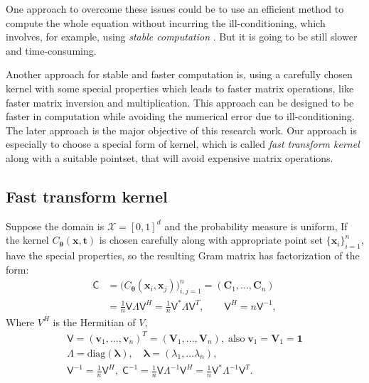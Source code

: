 \documentclass[smallextended]{svjour3}       %
\newcommand{\bm}[1]{\boldsymbol{#1}}
\newcommand{\vlambda}{{\bm{\lambda}}}
\newcommand{\vtheta}{{\bm{\theta}}}
\newcommand{\vC}{\bm{C}}
\newcommand{\vt}{\bm{t}}
\newcommand{\vv}{\bm{v}}
\newcommand{\vV}{\bm{V}}
\newcommand{\vx}{\bm{x}}
\newcommand{\vone}{\bm{1}}
\newcommand{\mC}{\mathsf{C}}
\newcommand{\mCInv}{{\mathsf{C}^{-1}}}
\newcommand{\mLambda}{\mathsf{\Lambda}}
\newcommand{\mV}{\mathsf{V}}
\newcommand{\diag}{\text{diag}}
\begin{document}
One approach to overcome these issues could be to use an efficient method to compute the whole equation without incurring the ill-conditioning, which involves, for example, using \textit{stable computation} \cite{FassBook2007}. But it is going to be still slower and time-consuming. 

Another approach for stable and faster computation is, using a carefully chosen kernel with some special properties which leads to faster matrix operations, like faster matrix inversion and multiplication. 
This approach can be designed to be faster in computation while avoiding the numerical error due to ill-conditioning. 
The later approach is the major objective of this research work. 
Our approach is especially to choose a special form of kernel, which is called \emph{fast transform kernel} along with a suitable pointset, that will avoid expensive matrix operations.






\subsection{Fast transform kernel}
Suppose the domain is $\mathcal{X} = [0,1]^d$ and the probability measure is uniform, If the kernel $C_\vtheta(\vx,\vt)$ is chosen carefully along with appropriate point set $\{\vx_i\}_{i=1}^n$, have the special properties, so the resulting Gram matrix has factorization of the form:
\begin{align}
\nonumber
\mC &= \Big(C_\vtheta(\vx_i,\vx_j)\Big)_{i,j=1}^n  = (\vC_1,...,\vC_n) 
\\
\label{eqn:ftk_factor}
&= \frac 1n \mV \mLambda \mV^H  = \frac 1n \mV^* \mLambda \mV^T , 
\quad \quad \mV^H = n \mV^{-1},
\end{align}
Where $V^H$ is the Hermitian of $V$,
\begin{gather*}
\mV = (\vv_1,...,\vv_n)^T = (\vV_1,...,\vV_n), \; \text{also} \;  \vv_1 = \vV_1 = \vone
\\
\mLambda = \diag(\vlambda), \quad 
\vlambda = (\lambda_1, ... \lambda_n),
\\
\mV^{-1} = \frac 1n \mV^H, \;
\mCInv  = \frac 1n \mV \mLambda^{-1} \mV^H
 = \frac 1n \mV^* \mLambda^{-1} \mV^T
.
\end{gather*}
\end{document}
